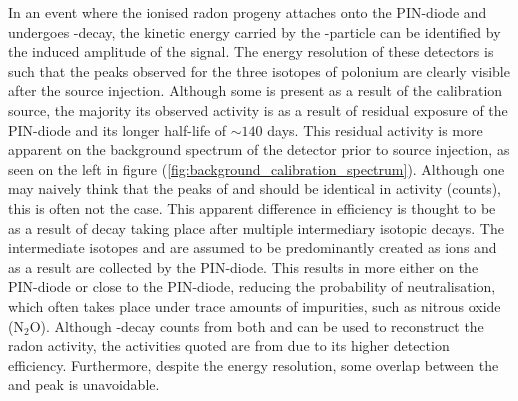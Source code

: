 In an event where the ionised radon progeny attaches onto the PIN-diode and undergoes \alpha{}-decay, the kinetic energy carried by the \alpha{}-particle can be identified by the induced amplitude of the signal. The energy resolution of these detectors is such that the peaks observed for the three isotopes of polonium are clearly visible after the source injection. Although some \PoTOZ{} is present as a result of the calibration source, the majority its observed activity is as a result of residual exposure of the PIN-diode and its longer half-life of $\sim140$ days. This residual activity is more apparent on the background spectrum of the detector prior to source injection, as seen on the left in figure (\ref{fig:background_calibration_spectrum}). Although one may naively think that the peaks of \PoTOF{} and \PoTOF{} should be identical in activity (counts), this is often not the case. This apparent difference in efficiency is thought to be as a result of \PoTOF{} decay taking place after multiple intermediary isotopic decays. The intermediate isotopes \PbTOF{} and \BiTOE{} are assumed to be predominantly created as ions and as a result are collected by the PIN-diode. This results in more \PbTOF{} either on the PIN-diode or close to the PIN-diode, reducing the probability of neutralisation, which often takes place under trace amounts of impurities, such as nitrous oxide (N$_{2}$O). Although \alpha{}-decay counts from both \PoTOE{} and \PoTOF{} can be used to reconstruct the radon activity, the activities quoted are from \PoTOF{} due to its higher detection efficiency. Furthermore, despite the energy resolution, some overlap between the \PoTOE{} and \PoTOZ{} peak is unavoidable.
%
